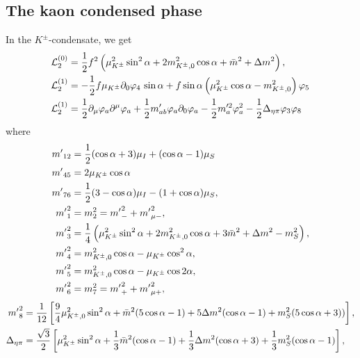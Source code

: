 \subsection{The kaon condensed phase}

In the $K^\pm$-condensate, we get
%
\begin{align}
    \label{static three-flavor Lagrangian kaon condensate}
    \mathcal{L}^{(0)}_2 
    & =
    \frac{1}{2}f^2 
    \left(
        \mu_{K^\pm}^2 \sin^2\alpha
        + 2m^2_{{K^\pm}, 0} \cos\alpha
        + \bar m^2 +\Delta m^2
    \right), \\
    \label{linear three-flavor Lagrangian kaon condensate}
    \mathcal{L}_2^{(1)}
    & 
    =
    - \frac{1}{2}f\mu_{K^\pm}\partial_0\varphi_4 \, \sin\alpha 
    + f\sin\alpha
    \left(
        \mu_{K^\pm}^2 \cos\alpha
        -m_{{K^\pm},0}^2
    \right)\varphi_5\\
    \label{quadratic three-flavor Lagrangian kaon condensate}
    \mathcal{L}_2^{(1)}
    & =
    \frac{1}{2} \partial_\mu \varphi_a \partial^\mu \varphi_a
    + \frac{1}{2}m'_{ab} \varphi_a\partial_0\varphi_a
    - \frac{1}{2}m'^2_{a} \varphi_a^2
    - \frac{1}{2}\Delta_{\eta\pi} \varphi_3\varphi_8
\end{align}
%
where
%
\begingroup
\allowdisplaybreaks
\begin{align}
    {m'}_{12} &= \frac{1}{2}(\cos\alpha + 3)\mu_I + (\cos\alpha - 1)\mu_S \\
    {m'}_{45} &= 2\mu_{K^\pm}\cos\alpha \\
    {m'}_{76} &= \frac{1}{2}(3-\cos\alpha) \mu_I - (1 + \cos\alpha)\mu_S, \\
    {m'}_1^2 & = m_2^2 = {m'}_-^2 + {m'}_{\mu-}^2,\\
    {m'}_3^2 
    & = 
    \frac{1}{4}
    \left(
        \mu_{K^\pm}^2 \sin^2\alpha
        + 2 m_{{K^\pm}, 0}^2\cos\alpha
        + 3\bar m^2
        + \Delta m^2
        - m_S^2
    \right),\\
    {m'}_4^2 & = m_{{K^\pm},0}^2\cos\alpha -\mu_{K^\pm} \cos^2\alpha, \\
    {m'}_5^2 & = m_{{K^\pm},0}^2\cos\alpha -\mu_{K^\pm} \cos 2\alpha, \\
    {m'}_6^2 & = m_7^2 = {m'}_+^2 + {m'}_{\mu+}^2,
\end{align}
\begin{align}
    {m'}_8^2
    & =
    \frac{1}{12}
    \left[
        \frac{9}{4}\mu_{{K^\pm},0}^2\sin^2\alpha
        + \bar m^2(5\cos\alpha-1) 
        + 5\Delta m^2(\cos\alpha-1)
        + m_S^2(5\cos\alpha+3))
    \right], \\
    \Delta_{\eta\pi}
    & =
    \frac{\sqrt{3}}{2}
    \left[
        \mu_{K^\pm}^2\sin^2\alpha
        + \frac{1}{3}\bar m^2(\cos\alpha - 1)
        + \frac{1}{3}\Delta m^2(\cos\alpha + 3)
        + \frac{1}{3}m^2_S(\cos\alpha - 1)
    \right],
\end{align}
